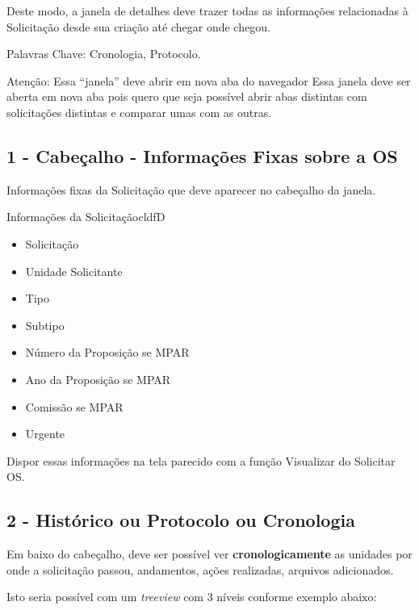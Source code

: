 	Deste modo, a janela de detalhes deve trazer todas as informações relacionadas à Solicitação desde sua criação até chegar onde chegou.
	
	Palavras Chave: Cronologia, Protocolo.

	\begin{funcionalidade}{Atenção: Essa ``janela'' deve abrir em nova aba do navegador}
		Essa janela deve ser aberta em nova aba pois quero que seja possível abrir abas distintas com solicitações distintas e comparar umas com as outras.
	\end{funcionalidade}		

	\subsection{1 - Cabeçalho - Informações Fixas sobre a OS}
		Informações fixas da Solicitação que deve aparecer no cabeçalho da janela.


		\begin{env-cor}{Informações da Solicitação}{cldfD}
			\begin{itemize}
				\item Solicitação
				\item Unidade Solicitante
				\item Tipo
				\item Subtipo
				\item Número da Proposição se MPAR
				\item Ano da Proposição se MPAR
				\item Comissão se MPAR
				\item Urgente
			\end{itemize}
		\end{env-cor}

		Dispor essas informações na tela parecido com a função Visualizar do Solicitar OS.
		
		
	\subsection{2 - Histórico ou Protocolo ou Cronologia}

	Em baixo do cabeçalho, deve ser possível ver \textbf{cronologicamente} as unidades por onde a solicitação passou, andamentos, ações realizadas, arquivos adicionados.
	
	Isto seria possível com um \emph{treeview} com 3 níveis conforme exemplo abaixo:


